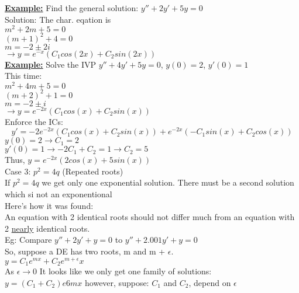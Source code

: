 \documentclass[12pt]{article}
\newcommand{\myt}[1]{\textbf{\underline{#1}}}
\begin{document}
	\myt{Example:} Find the general solution: $y'' + 2y' + 5y = 0$\\
	Solution: The char. eqation is \\
	$m^2 + 2m + 5 = 0$\\
	$(m + 1)^2 + 4 = 0$\\
	$m = -2 \pm 2i$\\
	$\rightarrow y = e^{-x}(C_1cos(2x) + C_2sin(2x))$\\
	
	\myt{Example:} Solve the IVP $y'' + 4y' + 5y = 0$, $y(0) = 2$, $y'(0) = 1$\\
	This time:\\
	$m^{2} + 4m + 5 = 0$\\
	$(m+2)^2 + 1 = 0$\\
	$m = -2 \pm i$\\
	$\rightarrow y = e^{-2x}(C_1cos(x) + C_2sin(x))$\\
	
	Enforce the ICs:\\
	$$y' = -2e^{-2x}(C_1cos(x) + C_2sin(x)) + e^{-2x}(-C_1sin(x) + C_2cos(x))$$
	$y(0) = 2 \rightarrow C_1 = 2$\\
	$y'(0) = 1 \rightarrow -2C_1 + C_2 = 1 \rightarrow C_2 = 5$\\
	
	Thus, $y = e^{-2x}(2cos(x) + 5sin(x))$\\
	
	Case 3: $p^2 = 4q$ (Repeated roots)\\
	If $p^2 = 4q$ we get only one exponential solution. There must be a second solution which si not an exponentional\\
	
	Here's how it was found:\\
	An equation with 2 identical roots should not differ much from an equation with 2 \underline{nearly} identical roots.\\
	Eg: Compare $y'' + 2y' + y = 0$ to $y'' + 2.001y' + y = 0$\\
	
	So, suppose a DE has two roots, m and m + $\epsilon$.\\
	$y = C_1e^{mx} + C_2e^{m+\epsilon}x$\\
	
	As $\epsilon \rightarrow 0$ It looks like we only get one family of solutions:\\
	$y = (C_1 + C_2)e6{mx}$ however, suppose:
	$C_1$ and $C_2$, depend on $\epsilon$\\
	
\end{document}
